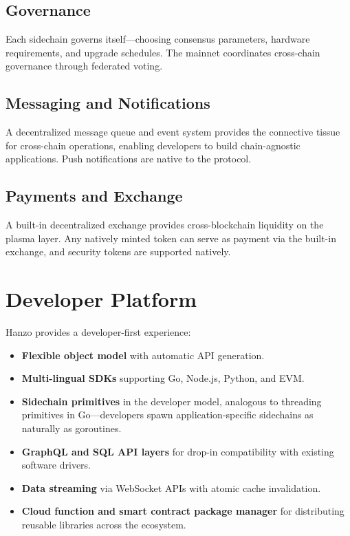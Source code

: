 \documentclass[11pt,twocolumn]{article}
\begin{document}
\subsection{Governance}
Each sidechain governs itself---choosing consensus parameters, hardware
requirements, and upgrade schedules. The mainnet coordinates cross-chain
governance through federated voting.

\subsection{Messaging and Notifications}
A decentralized message queue and event system provides the connective tissue for
cross-chain operations, enabling developers to build chain-agnostic applications.
Push notifications are native to the protocol.

\subsection{Payments and Exchange}
A built-in decentralized exchange provides cross-blockchain liquidity on the
plasma layer. Any natively minted token can serve as payment via the built-in
exchange, and security tokens are supported natively.

\section{Developer Platform}
\label{sec:developer}

Hanzo provides a developer-first experience:

\begin{itemize}[leftmargin=1.1em]
    \item \textbf{Flexible object model} with automatic API generation.
    \item \textbf{Multi-lingual SDKs} supporting Go, Node.js, Python, and EVM.
    \item \textbf{Sidechain primitives} in the developer model, analogous to
    threading primitives in Go---developers spawn application-specific sidechains
    as naturally as goroutines.
    \item \textbf{GraphQL and SQL API layers} for drop-in compatibility with
    existing software drivers.
    \item \textbf{Data streaming} via WebSocket APIs with atomic cache
    invalidation.
    \item \textbf{Cloud function and smart contract package manager} for
    distributing reusable libraries across the ecosystem.
\end{itemize}
\end{document}
